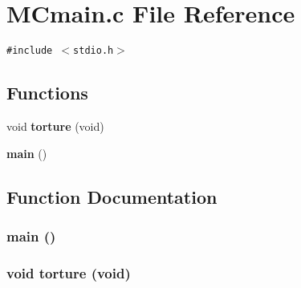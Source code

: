 \section{MCmain.c File Reference}
\label{MCmain_8c}
{\tt \#include $<$stdio.h$>$}\par
\subsection*{Functions}
\begin{CompactItemize}
\item 
void {\bf torture} (void)
\item 
{\bf main} ()
\end{CompactItemize}


\subsection{Function Documentation}
\subsubsection{\setlength{\rightskip}{0pt plus 5cm}main ()}\label{MCmain_8c_a1}


\subsubsection{\setlength{\rightskip}{0pt plus 5cm}void torture (void)}\label{MCmain_8c_a0}


